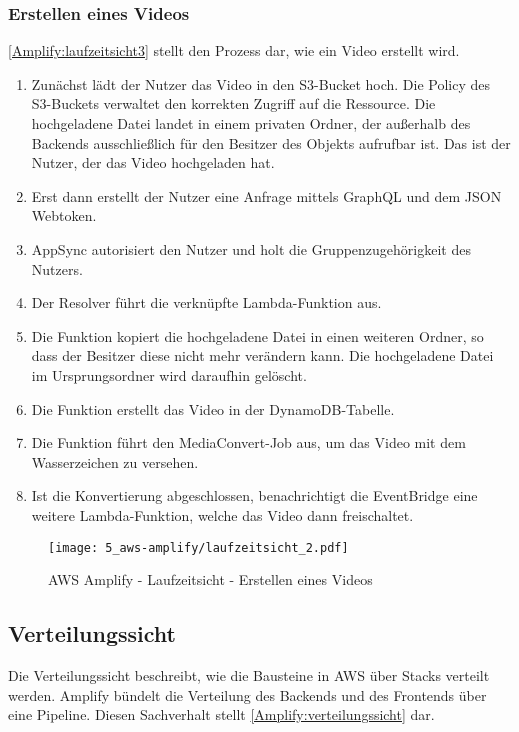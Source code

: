 \subsubsection{Erstellen eines Videos}

\autoref{Amplify:laufzeitsicht3} stellt den Prozess dar, wie ein Video erstellt wird.
\begin{enumerate}
  \item{Zunächst lädt der Nutzer das Video in den S3-Bucket hoch. Die Policy des S3-Buckets verwaltet den korrekten Zugriff auf die Ressource. Die hochgeladene Datei landet in einem privaten Ordner, der außerhalb des Backends ausschließlich für den Besitzer des Objekts aufrufbar ist. Das ist der Nutzer, der das Video hochgeladen hat.}
  \item{Erst dann erstellt der Nutzer eine Anfrage mittels GraphQL und dem JSON Webtoken.}
  \item{AppSync autorisiert den Nutzer und holt die Gruppenzugehörigkeit des Nutzers.}
  \item{Der Resolver führt die verknüpfte Lambda-Funktion aus.}
  \item{Die Funktion kopiert die hochgeladene Datei in einen weiteren Ordner, so dass der Besitzer diese nicht mehr verändern kann. Die hochgeladene Datei im Ursprungsordner wird daraufhin gelöscht.}
  \item{Die Funktion erstellt das Video in der DynamoDB-Tabelle.}
  \item{Die Funktion führt den MediaConvert-Job aus, um das Video mit dem Wasserzeichen zu versehen.}
  \item{Ist die Konvertierung abgeschlossen, benachrichtigt die EventBridge eine weitere Lambda-Funktion, welche das Video dann freischaltet.}
\end{enumerate}

\begin{figure}
  \centering
  \texttt{[image: 5\_aws-amplify/laufzeitsicht\_2.pdf]}
  \caption{AWS Amplify - Laufzeitsicht - Erstellen eines Videos}
  \label{Amplify:laufzeitsicht3}
\end{figure}

\subsection{Verteilungssicht}

Die Verteilungssicht beschreibt, wie die Bausteine in \ac{AWS} über Stacks verteilt werden. Amplify bündelt die Verteilung des Backends und des Frontends über eine Pipeline. Diesen Sachverhalt stellt \autoref{Amplify:verteilungssicht} dar.

